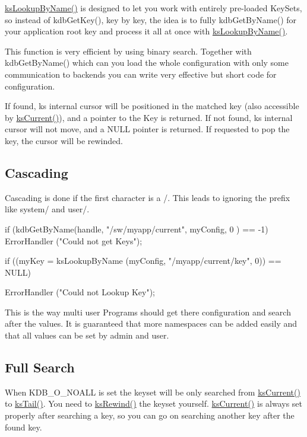 {\ttfamily \hyperlink{group__keyset_gad2e30fb6d4739d917c5abb2ac2f9c1a1}{ksLookupByName()}} is designed to let you work with entirely pre-\/loaded KeySets, so instead of kdbGetKey(), key by key, the idea is to fully kdbGetByName() for your application root key and process it all at once with {\ttfamily \hyperlink{group__keyset_gad2e30fb6d4739d917c5abb2ac2f9c1a1}{ksLookupByName()}}.

This function is very efficient by using binary search. Together with kdbGetByName() which can you load the whole configuration with only some communication to backends you can write very effective but short code for configuration.

If found, {\ttfamily ks} internal cursor will be positioned in the matched key (also accessible by \hyperlink{group__keyset_ga4287b9416912c5f2ab9c195cb74fb094}{ksCurrent()}), and a pointer to the Key is returned. If not found, {\ttfamily ks} internal cursor will not move, and a NULL pointer is returned. If requested to pop the key, the cursor will be rewinded.\hypertarget{group__keyset_cascading}{}\subsection{Cascading}\label{group__keyset_cascading}
Cascading is done if the first character is a /. This leads to ignoring the prefix like system/ and user/. 
\begin{DoxyCode}
        if (kdbGetByName(handle, "/sw/myapp/current", myConfig, 0 ) == -1)
                ErrorHandler ("Could not get Keys");

        if ((myKey = ksLookupByName (myConfig, "/myapp/current/key", 0)) == NULL)
      
                ErrorHandler ("Could not Lookup Key");
\end{DoxyCode}


This is the way multi user Programs should get there configuration and search after the values. It is guaranteed that more namespaces can be added easily and that all values can be set by admin and user.\hypertarget{group__keyset_fullsearch}{}\subsection{Full Search}\label{group__keyset_fullsearch}
When KDB\_\-O\_\-NOALL is set the keyset will be only searched from \hyperlink{group__keyset_ga4287b9416912c5f2ab9c195cb74fb094}{ksCurrent()} to \hyperlink{group__keyset_gadca442c4ab43cf532b15091d7711559e}{ksTail()}. You need to \hyperlink{group__keyset_gabe793ff51f1728e3429c84a8a9086b70}{ksRewind()} the keyset yourself. \hyperlink{group__keyset_ga4287b9416912c5f2ab9c195cb74fb094}{ksCurrent()} is always set properly after searching a key, so you can go on searching another key after the found key.


